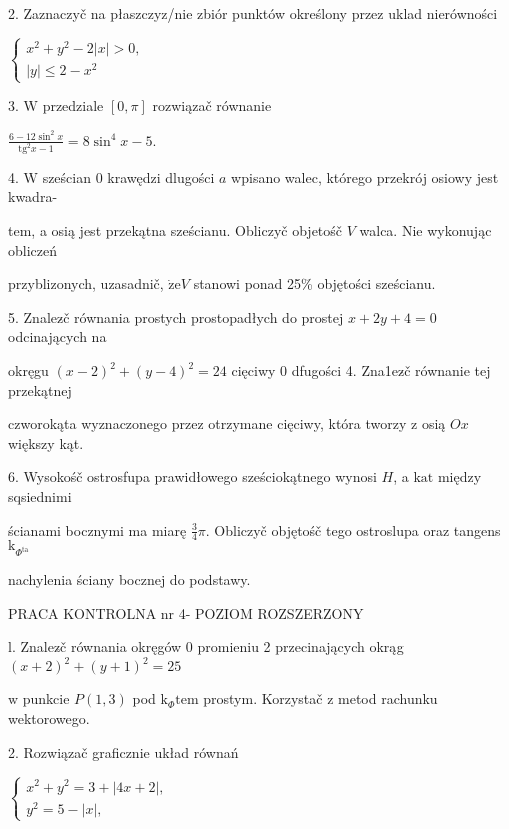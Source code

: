 \documentclass[a4paper,12pt]{article}
\begin{document}
2. Zaznaczyč na płaszczyz/nie zbiór punktów określony przez uklad nierówności

$\left\{\begin{array}{l}
x^{2}+y^{2}-2|x|>0,\\
|y|\leq 2-x^{2}
\end{array}\right.$

3. $\mathrm{W}$ przedziale $[0,\pi]$ rozwiązač równanie

$\displaystyle \frac{6-12\sin^{2}x}{\mathrm{t}\mathrm{g}^{2}x-1}=8\sin^{4}x-5.$

4. $\mathrm{W}$ sześcian $0$ krawędzi dlugości $a$ wpisano walec, którego przekrój osiowy jest kwadra-

tem, a osią jest przekątna sześcianu. Obliczyč objetośč $V$ walca. Nie wykonując obliczeń

przyblizonych, uzasadnič, $\dot{\mathrm{z}}\mathrm{e}V$ stanowi ponad 25\% objętości sześcianu.

5. Znalez$\acute{}$č równania prostych prostopadłych do prostej $x+2y+4 = 0$ odcinających na

okręgu $(x-2)^{2}+(y-4)^{2} =24$ cięciwy $0$ dfugości 4. Zna1ez$\acute{}$č równanie tej przekątnej

czworokąta wyznaczonego przez otrzymane cięciwy, która tworzy $\mathrm{z}$ osią $Ox$ większy kąt.

6. Wysokośč ostrosfupa prawidłowego sześciokątnego wynosi $H$, a $\mathrm{k}\mathrm{a}\mathrm{t}$ między sqsiednimi

ścianami bocznymi ma miarę $\displaystyle \frac{3}{4}\pi$. Obliczyč objętośč tego ostroslupa oraz tangens $\mathrm{k}_{\Phi^{\mathrm{t}\mathrm{a}}}$

nachylenia ściany bocznej do podstawy.





PRACA KONTROLNA nr 4- POZIOM ROZSZERZONY

l. Znalez$\acute{}$č równania okręgów $0$ promieniu 2 przecinających okrąg $(x+2)^{2}+(y+1)^{2}=25$

$\mathrm{w}$ punkcie $P(1,3)$ pod $\mathrm{k}_{\Phi}\mathrm{t}\mathrm{e}\mathrm{m}$ prostym. Korzystač $\mathrm{z}$ metod rachunku wektorowego.

2. Rozwiązač graficznie układ równań

$\left\{\begin{array}{l}
x^{2}+y^{2}=3+|4x+2|,\\
y^{2}=5-|x|,
\end{array}\right.$
\end{document}
